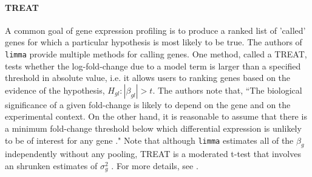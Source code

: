 \paragraph{TREAT}
A common goal of gene expression profiling is to produce a ranked list of 'called' genes for which a particular hypothesis is most likely to be true. The authors of \texttt{limma} provide multiple methods for calling genes. One method, called a TREAT, tests whether the log-fold-change due to a model term is larger than a specified threshold in absolute value, i.e. it allows users to ranking genes based on the evidence of the hypothesis, $H_{gl}:|\beta_{gl}|>t$. The authors note that, ``The biological significance of a given fold-change is likely to depend on the gene and on the experimental context. On the other hand, it is reasonable to assume that there is a minimum fold-change threshold below which differential expression is unlikely to be of interest for any gene \citep[pp. 765-755]{treat}." Note that although \texttt{limma} estimates all of the $\beta_g$ independently without any pooling, TREAT is a moderated t-test that involves an shrunken estimates of $\sigma^2_g$ \citep{treat}. For more details, see \citet{treat}.

